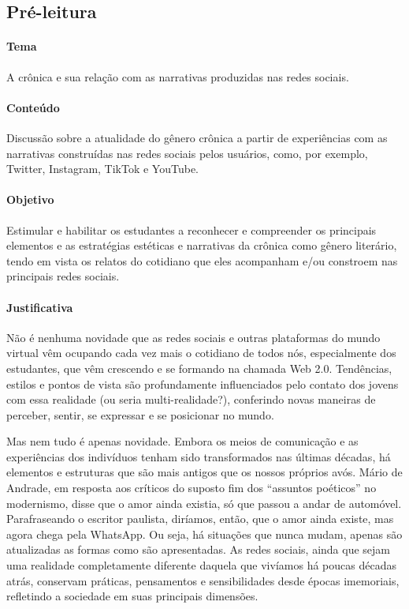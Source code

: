 \documentclass[12pt]{extarticle}
\begin{document}


\subsection{Pré-leitura}

\paragraph{Tema} A crônica e sua relação com as narrativas produzidas nas
  redes sociais.

\paragraph{Conteúdo} Discussão sobre a atualidade do gênero crônica a
partir de experiências com as narrativas construídas nas redes sociais
pelos usuários, como, por exemplo, Twitter, Instagram, TikTok e YouTube.

\paragraph{Objetivo} Estimular e habilitar os estudantes a reconhecer e
compreender os principais elementos e as estratégias estéticas e
narrativas da crônica como gênero literário, tendo em vista os relatos
do cotidiano que eles acompanham e/ou constroem nas principais redes
sociais.

\paragraph{Justificativa} Não é nenhuma novidade que as redes sociais e
outras plataformas do mundo virtual vêm ocupando cada vez mais o
cotidiano de todos nós, especialmente dos estudantes, que vêm crescendo
e se formando na chamada Web 2.0. Tendências, estilos e pontos de vista
são profundamente influenciados pelo contato dos jovens com essa
realidade (ou seria multi-realidade?), conferindo novas maneiras de
perceber, sentir, se expressar e se posicionar no mundo.

Mas nem tudo é apenas novidade. Embora os meios de comunicação e
as experiências dos indivíduos tenham sido transformados nas últimas
décadas, há elementos e estruturas que são mais antigos que os nossos
próprios avós. Mário de Andrade, em resposta aos críticos do suposto fim
dos ``assuntos poéticos'' no modernismo, disse que o amor ainda existia,
só que passou a andar de automóvel. Parafraseando o escritor paulista,
diríamos, então, que o amor ainda existe, mas agora chega pela WhatsApp.
Ou seja, há situações que nunca mudam, apenas são atualizadas as formas
como são apresentadas. As redes sociais, ainda que sejam uma realidade
completamente diferente daquela que vivíamos há poucas décadas atrás,
conservam práticas, pensamentos e sensibilidades desde épocas
imemoriais, refletindo a sociedade em suas principais dimensões.
\end{document}
